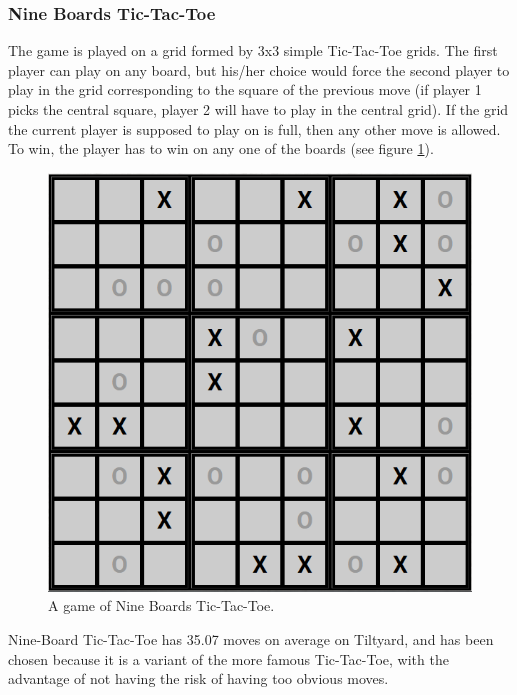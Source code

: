 \subsubsection*{Nine Boards Tic-Tac-Toe}
The game is played on a grid formed by 3x3 simple Tic-Tac-Toe grids. The first player can play on any board, but his/her choice would force the second player to play in the grid corresponding to the square of the previous move (if player 1 picks the central square, player 2 will have to play in the central grid). If the grid the current player is supposed to play on is full, then any other move is allowed. To win, the player has to win on any one of the boards (see figure \ref{fig:9boardttt}).
\begin{figure}[H]
\centering
	\includegraphics[scale=0.35]{figure/9boardstictactoe}
    \caption{A game of Nine Boards Tic-Tac-Toe.}
    \label{fig:9boardttt}
\end{figure}
Nine-Board Tic-Tac-Toe has 35.07 moves on average on Tiltyard\cite{nineboards}, and has been chosen because it is a variant of the more famous Tic-Tac-Toe, with the advantage of not having the risk of having too obvious moves.
